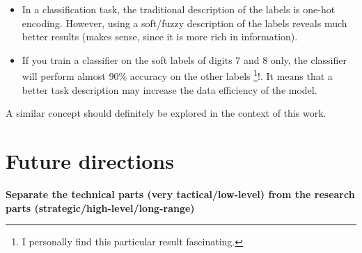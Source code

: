     \begin{itemize}
        \item In a classification task, the traditional description of the labels is one-hot encoding. However, using a soft/fuzzy description of the labels reveals much better results (makes sense, since it is more rich in information).
        \item If you train a classifier on the soft labels of digits 7 and 8 only, the classifier will perform almost 90\% accuracy on the other labels \footnote{I personally find this particular result fascinating.}!. It means that a better task description may increase the data efficiency of the model.
    \end{itemize}
    A similar concept should definitely be explored in the context of this work.

\section{Future directions}\label{sec:future_direction}
  \par
  \textbf{Separate the technical parts (very tactical/low-level) from the research parts (strategic/high-level/long-range)}

